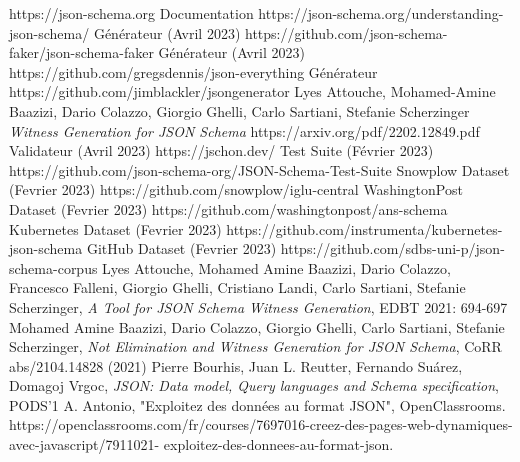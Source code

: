 \documentclass{article}
\begin{document}
\begin{thebibliography}{8}

\json \hspace{1mm} https://json-schema.org
\json \hspace{1mm} Documentation https://json-schema.org/understanding-json-schema/
\jsf \hspace{1mm} Générateur (Avril 2023) https://github.com/json-schema-faker/json-schema-faker
\je \hspace{1mm} Générateur (Avril 2023) https://github.com/gregsdennis/json-everything
\jg \hspace{1mm} Générateur https://github.com/jimblackler/jsongenerator
Lyes Attouche, Mohamed-Amine Baazizi, Dario Colazzo, Giorgio Ghelli, Carlo Sartiani, Stefanie Scherzinger \emph{Witness Generation for JSON Schema} https://arxiv.org/pdf/2202.12849.pdf
\jschon \hspace{1mm} Validateur (Avril 2023) https://jschon.dev/
\json \hspace{1mm} Test Suite (Février 2023) https://github.com/json-schema-org/JSON-Schema-Test-Suite
 Snowplow Dataset (Fevrier 2023) https://github.com/snowplow/iglu-central
 WashingtonPost Dataset (Fevrier 2023) https://github.com/washingtonpost/ans-schema
 Kubernetes Dataset (Fevrier 2023) https://github.com/instrumenta/kubernetes-json-schema
 GitHub Dataset (Fevrier 2023) https://github.com/sdbs-uni-p/json-schema-corpus
\bibitem{}Lyes Attouche, Mohamed Amine Baazizi, Dario Colazzo, Francesco Falleni, Giorgio Ghelli, Cristiano Landi, Carlo Sartiani, Stefanie Scherzinger,  \emph{A Tool for JSON Schema Witness Generation}, EDBT 2021: 694-697
\bibitem{}Mohamed Amine Baazizi, Dario Colazzo, Giorgio Ghelli, Carlo Sartiani, Stefanie Scherzinger, \emph{Not Elimination and Witness Generation for JSON Schema}, CoRR abs/2104.14828 (2021)
\bibitem{}Pierre Bourhis, Juan L. Reutter, Fernando Suárez, Domagoj Vrgoc,  \emph{JSON: Data model, Query languages and Schema specification}, PODS’1
\bibitem{}A. Antonio, "Exploitez des données au format JSON", OpenClassrooms. 
https://openclassrooms.com/fr/courses/7697016-creez-des-pages-web-dynamiques-avec-javascript/7911021-
exploitez-des-donnees-au-format-json.

\end{thebibliography}
\end{document}
